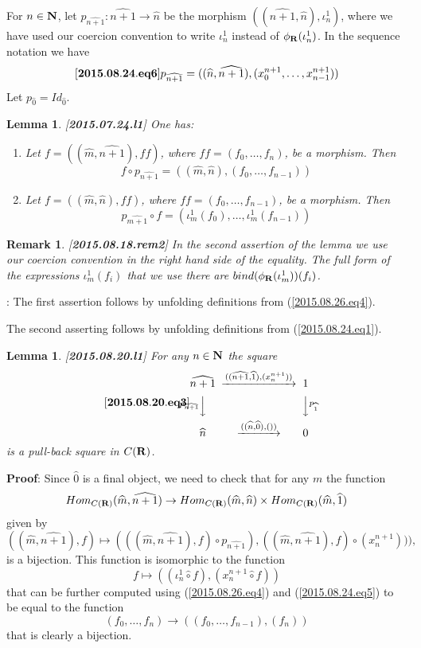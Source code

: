 \documentclass[11pt]{article}
\newenvironment{eq}{\begin{equation}}{\end{equation}}
\newenvironment{proof}{{\bf Proof}:}{\vskip 5mm }
\newtheorem{lemma}[proposition]{Lemma}
\newtheorem{remark}[proposition]{Remark}
\newcommand{\llabel}[1]{\label{#1}[{\bf #1}]}
\newcommand{\sr}{\rightarrow}
\newcommand{\nn}{{\bf N\rm}}
\newcommand{\nat}{\nn}
\newcommand{\rr}{{\bf R}}
\newcommand{\wh}{\widehat}
\newcommand{\bind}{bind}
\newcommand{\hc}{\wh{\circ}}
\begin{document}
For $n\in\nat$, let $p_{\wh{n+1}}:\wh{n+1}\sr \wh{n}$ be the morphism $((\wh{n+1},\wh{n}),\iota_n^1)$,
where we have used our coercion convention to write $\iota_n^1$ instead of $\phi_{\rr}(\iota_n^1)$. In the sequence notation we have
%
\begin{eq}\llabel{2015.08.24.eq6}
p_{\wh{n+1}}=((\wh{n},\wh{n+1}),(x_0^{n+1},\dots,x_{n-1}^{n+1}))
\end{eq}
%
Let  $p_{\wh{0}}=Id_{\wh{0}}$.
%
\begin{lemma}
\llabel{2015.07.24.l1}
One has:
%
\begin{enumerate}
\item Let $f=((\wh{m},\wh{n+1}),ff)$, where $ff=(f_0,\dots,f_n)$, be a morphism. Then 
%
$$f\circ p_{\wh{n+1}}=((\wh{m},\wh{n}),(f_0,\dots,f_{n-1}))$$
%
\item Let $f=((\wh{m},\wh{n}),ff)$, where $ff=(f_0,\dots,f_{n-1})$, be a morphism. Then 
%
$$p_{\wh{m+1}}\circ f=(\iota_m^1(f_0),\dots,\iota_m^1(f_{n-1}))$$
%
\end{enumerate}
\end{lemma}
%
\begin{remark}\rm
\llabel{2015.08.18.rem2}
In the second assertion of the lemma we use our coercion convention in the right hand side of the equality. The full form of the expressions $\iota_m^1(f_i)$ that we use there are $\bind(\phi_{\rr}(\iota_m^1))(f_i)$.
\end{remark}
%
\begin{proof}
The first assertion follows by unfolding definitions from (\ref{2015.08.26.eq4}). 

The second asserting follows by unfolding definitions from (\ref{2015.08.24.eq1}). 
\end{proof}
%
\begin{lemma}
\llabel{2015.08.20.l1}
For any $n\in\nat$ the square
%
\begin{eq}\llabel{2015.08.20.eq3}
\begin{CD}
\wh{n+1} @>((\wh{n+1},\wh{1}),(x_n^{n+1}))>> 1\\
@Vp_{\wh{n+1}}VV @VVp_{\wh{1}}V\\
\wh{n} @>((\wh{n},\wh{0}),())>> 0
\end{CD}
\end{eq}
%
is a pull-back square in $C(\rr)$.
\end{lemma}
%
\begin{proof}
Since $\wh{0}$ is a final object, we need to check that for any $m$ the function
%
$$Hom_{C(\rr)}(\wh{m},\wh{n+1})\sr Hom_{C(\rr)}(\wh{m},\wh{n})\times Hom_{C(\rr)}(\wh{m},\wh{1})$$
%
given by 
%
$$((\wh{m},\wh{n+1}),f)\mapsto (((\wh{m},\wh{n+1}),f)\circ p_{\wh{n+1}}),((\wh{m},\wh{n+1}),f)\circ (x_n^{n+1}))),$$
%
is a bijection. This function is isomorphic to the function
%
$$f\mapsto ((\iota_n^1\hc f),(x_n^{n+1}\hc f))$$
%
that can be further computed using (\ref{2015.08.26.eq4}) and (\ref{2015.08.24.eq5}) to be equal to the function 
%
$$(f_0,\dots,f_{n})\sr ((f_0,\dots,f_{n-1}), (f_n))$$
%
that is clearly a bijection. 
\end{proof}
\end{document}
